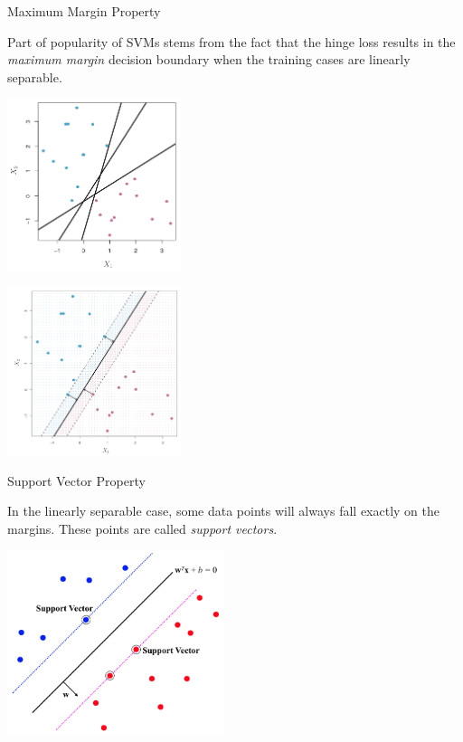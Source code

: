 \documentclass[serif,xcolor=pdftex,dvipsnames,table,hyperref={bookmarks=false}]{beamer}
\begin{document}
\begin{frame}[t]{Maximum Margin Property}

Part of popularity of SVMs stems from the fact that the hinge loss results in the \textit{maximum margin} decision boundary when the training cases are linearly separable.

\center
\begin{minipage}{2in}
\includegraphics[width=2in]{../Figures/svm-boundaries.png}
\end{minipage}%
\begin{minipage}{2in}
\includegraphics[width=2in]{../Figures/svm-opt.png}
\end{minipage}

\end{frame}

\begin{frame}[t]{Support Vector Property}

In the linearly separable case, some data points will always fall exactly on the margins. These points are called \textit{support vectors}.

\center
\includegraphics[width=2.5in]{../Figures/svm-support-vectors.png}

\end{frame}
\end{document}
